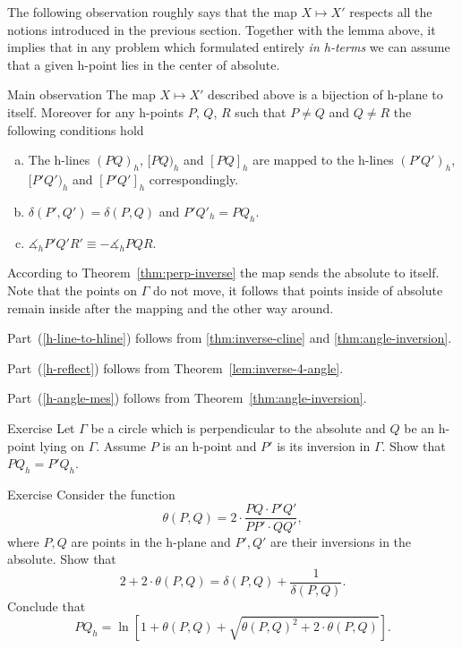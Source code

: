 The following observation roughly says that the map $X\mapsto X'$ respects all the notions introduced in the previous section.
Together with the lemma above, it implies that in any problem which formulated entirely {}\emph{in h-terms}  we can assume that a given h-point lies in the center of absolute.

\begin{thm}{Main observation}\label{thm:main-observ}
The map $X\mapsto X'$ described above is a bijection of h-plane to itself. 
Moreover for any h-points $P$, $Q$, $R$ such that $P\ne Q$ and $Q\ne R$ the following conditions hold
\begin{enumerate}[(a)]
\item\label{h-line-to-hline} The h-lines $(PQ)_h$, $[PQ)_h$ and $[PQ]_h$ are mapped to the h-lines $(P'Q')_h$, $[P'Q')_h$ and $[P'Q']_h$ correspondingly.
\item\label{h-reflect} $\delta(P',Q')=\delta(P,Q)$ and $P'Q'_h=PQ_h$.
\item\label{h-angle-mes} 
$\measuredangle_h P'Q'R'\equiv-\measuredangle_h PQR$.
\end{enumerate}

\end{thm}

According to Theorem~\ref{thm:perp-inverse} the map sends the absolute to itself. 
Note that the points on $\Gamma$ do not move, it follows that points inside of absolute remain inside after the mapping and the other way around. 


Part~(\ref{h-line-to-hline}) follows from \ref{thm:inverse-cline} and \ref{thm:angle-inversion}.

Part~(\ref{h-reflect}) follows from Theorem~\ref{lem:inverse-4-angle}.

Part~(\ref{h-angle-mes})  follows from Theorem~\ref{thm:angle-inversion}.
\qeds


\begin{thm}{Exercise}\label{ex:h-reflection}
Let $\Gamma$ be a circle which is perpendicular to the absolute and $Q$ be an h-point lying on $\Gamma$.
Assume $P$ is an h-point and $P'$ is its inversion in  $\Gamma$.
Show that $PQ_h=P'Q_h$.
\end{thm}

\begin{thm}{Exercise}\label{ex:def-delta}
Consider the function
\[\theta(P,Q)=2\cdot\frac{PQ\cdot  P'Q'}{PP'\cdot QQ'},\]
where $P, Q$ are points in the h-plane
and $P', Q'$ are their inversions in the absolute.
Show that 
\[2+2\cdot\theta(P,Q)
=
\delta(P,Q)+\frac{1}{\delta(P,Q)}.\]
Conclude that
\[PQ_h=\ln\left[1+\theta(P,Q)+\sqrt{\theta(P,Q)^2+2\cdot\theta(P,Q)}\right].\]

\end{thm}


